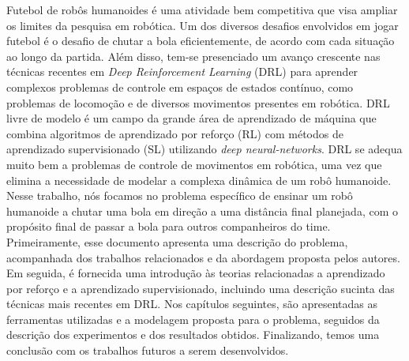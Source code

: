 
Futebol de rob\^os humanoides \'e uma atividade bem competitiva que visa ampliar os limites da pesquisa em rob\'otica. Um dos diversos desafios envolvidos em jogar futebol \'e o desafio de chutar a bola eficientemente, de acordo com cada situa\c c\~ao ao longo da partida. Al\'em disso, tem-se presenciado um avan\c co crescente nas t\'ecnicas recentes em \textit{Deep Reinforcement Learning} (DRL) para aprender complexos problemas de controle em espa\c cos de estados cont\'inuo, como problemas de locomo\c c\~ao e de diversos movimentos presentes em rob\'otica. DRL livre de modelo \'e um campo da grande \'area de aprendizado de m\'aquina que combina algoritmos de aprendizado por refor\c co (RL) com m\'etodos de aprendizado supervisionado (SL) utilizando \textit{deep neural-networks}. DRL se adequa muito bem a problemas de controle de movimentos em rob\'otica, uma vez que elimina a necessidade de modelar a complexa din\^amica de um rob\^o humanoide. Nesse trabalho, n\'os focamos no problema espec\'ifico de ensinar um rob\^o humanoide a chutar uma bola em dire\c c\~ao a uma dist\^ancia final planejada, com o prop\'osito final de passar a bola para outros companheiros do time. Primeiramente, esse documento apresenta uma descri\c c\~ao do problema, acompanhada dos trabalhos relacionados e da abordagem proposta pelos autores. Em seguida, \'e fornecida uma introdu\c c\~ao \`as teorias relacionadas a aprendizado por refor\c co e a aprendizado supervisionado, incluindo uma descri\c c\~ao sucinta das t\'ecnicas mais recentes em DRL. Nos cap\'itulos seguintes, s\~ao apresentadas as ferramentas utilizadas e a modelagem proposta para o problema, seguidos da descri\c c\~ao dos experimentos e dos resultados obtidos. Finalizando, temos uma conclus\~ao com os trabalhos futuros a serem desenvolvidos.





